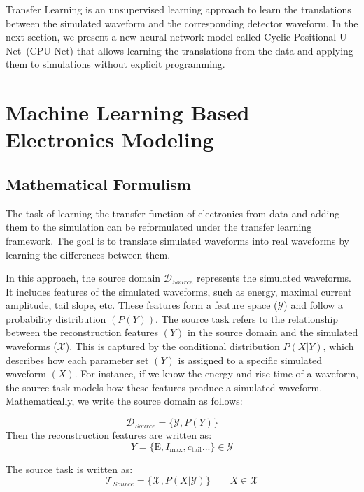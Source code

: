 Transfer Learning is an unsupervised learning approach to learn the translations between the simulated waveform and the corresponding detector waveform. In the next section, we present a new neural network model called Cyclic Positional U-Net~(CPU-Net) that allows learning the translations from the data and applying them to simulations without explicit programming.

\section{Machine Learning Based Electronics Modeling}
\subsection{Mathematical Formulism}
The task of learning the transfer function of electronics from data and adding them to the simulation can be reformulated under the transfer learning framework. The goal is to translate simulated waveforms into real waveforms by learning the differences between them.

In this approach, the source domain $\mathcal{D}_{Source}$ represents the simulated waveforms. It includes features of the simulated waveforms, such as energy, maximal current amplitude, tail slope, etc. These features form a feature space ($\mathcal{Y}$) and follow a probability distribution $(P(Y))$. The source task refers to the relationship between the reconstruction features $(Y)$ in the source domain and the simulated waveforms ($\mathcal{X}$). This is captured by the conditional distribution $P(X|Y)$, which describes how each parameter set $(Y)$ is assigned to a specific simulated waveform $(X)$. For instance, if we know the energy and rise time of a waveform, the source task models how these features produce a simulated waveform. Mathematically, we write the source domain as follows:

\begin{equation}
    \mathcal{D}_{Source}=\{\mathcal{Y},P(Y)\}\qquad 
    \label{eqn:source_domain}
\end{equation}
Then the reconstruction features are written as:
 \begin{equation}
     Y=\{\mathrm{E},I_{\mathrm{max}},c_{\mathrm{tail}}...\}\in \mathcal{Y}
 \end{equation}

The source task is written as:
\begin{equation}
    \mathcal{T}_{Source}=\{\mathcal{X},P(X|\mathcal{Y})\} \qquad X\in \mathcal{X}
    \label{eqn:source_task}
\end{equation}


